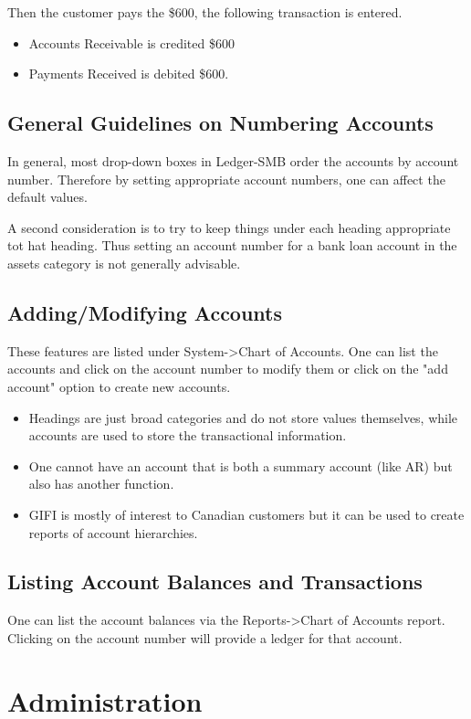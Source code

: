 \documentclass{article}
\begin{document}
Then the customer pays the \$600, the following transaction is entered.
\begin{itemize}
\item Accounts Receivable is credited \$600
\item Payments Received is debited \$600.
\end{itemize}

\subsection{General Guidelines on Numbering Accounts}
In general, most drop-down boxes in Ledger-SMB order the accounts by account
number.  Therefore by setting appropriate account numbers, one can affect the
default values.

A second consideration is to try to keep things under each heading appropriate
tot hat heading.  Thus setting an account number for a bank loan account in the
assets category is not generally advisable.

\subsection{Adding/Modifying Accounts}

These features are listed under System-\textgreater Chart of Accounts.
One can list the accounts and click on the account number to modify them or
click on the "add account" option to create new accounts.

\begin{itemize}
\item Headings are just broad categories and do not store values themselves,
while accounts are used to store the transactional information.
\item One cannot have an account that is both a summary account (like AR) but
also has another function.
\item GIFI is mostly of interest to Canadian customers but it can be used to
create reports of account hierarchies.
\end{itemize}

\subsection{Listing Account Balances and Transactions}
One can list the account balances via the Reports-\textgreater Chart of Accounts report.
Clicking on the account number will provide a ledger for that account.

\section{Administration}
\end{document}
